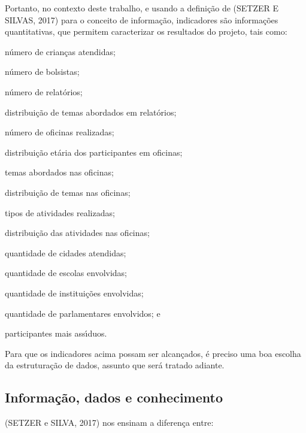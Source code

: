 \documentclass[
12pt,		%
openright,	%
twoside,  %
a4paper,			%
chapter=TITLE,		%
english,			%
french,				%
spanish,			%
brazil				%
]{USPSC-classe/USPSC}
\begin{document}
Portanto, no contexto deste trabalho, e usando a defini\c{c}\~ao de (SETZER E SILVAS, 2017) para o conceito de \textquotedbl informa\c{c}\~ao\textquotedbl , indicadores s\~ao informa\c{c}\~oes quantitativas, que permitem caracterizar os resultados do projeto, tais como:


















\begin{alineas}
\item n\'umero de crian\c{c}as atendidas;
\item n\'umero de bolsistas;
\item n\'umero de relat\'orios;
\item distribui\c{c}\~ao de temas abordados em relat\'orios;
\item n\'umero de oficinas realizadas;
\item distribui\c{c}\~ao et\'aria dos participantes em oficinas;
\item temas abordados nas oficinas;
\item distribui\c{c}\~ao de temas nas oficinas;
\item tipos de atividades realizadas;
\item distribui\c{c}\~ao das atividades nas oficinas;
\item quantidade de cidades atendidas;
\item quantidade de escolas envolvidas;
\item quantidade de institui\c{c}\~oes envolvidas;
\item quantidade de parlamentares envolvidos; e
\item participantes mais ass\'{\i}duos.
\end{alineas}

Para que os indicadores acima possam ser alcan\c{c}ados, \'e preciso uma boa escolha da estrutura\c{c}\~ao de dados, assunto que ser\'a tratado adiante.

















\subsection[Informa\c{c}\~ao, dados e conhecimento]{Informa\c{c}\~ao, dados e conhecimento}\label{Informa\c{c}\~ao, dados e conhecimento}
(SETZER e SILVA, 2017)  nos ensinam a diferen\c{c}a entre:
\end{document}
